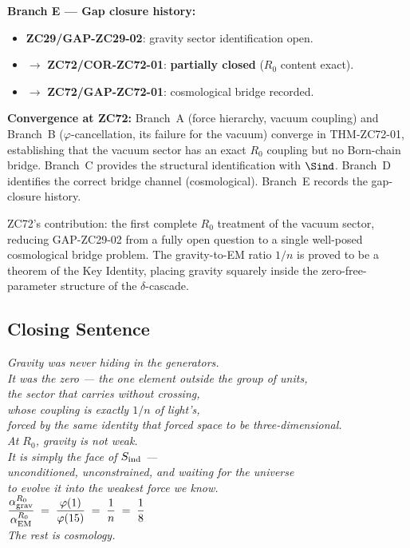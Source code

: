 \documentclass[12pt, a4paper]{article}
\begin{document}
\begin{genealogybox}[title={How ZC72's Key Objects Trace Back}]
\textbf{Branch E --- Gap closure history:}
\begin{itemize}[leftmargin=2em, noitemsep]
  \item \textbf{ZC29/GAP-ZC29-02}: gravity sector identification open.
  \item $\to$ \textbf{ZC72/COR-ZC72-01}:
    \textbf{partially closed} ($R_0$ content exact).
  \item $\to$ \textbf{ZC72/GAP-ZC72-01}: cosmological bridge recorded.
\end{itemize}

\textbf{Convergence at ZC72:}
Branch~A (force hierarchy, vacuum coupling) and Branch~B
($\varphi$-cancellation, its failure for the vacuum)
converge in THM-ZC72-01, establishing that the vacuum sector
has an exact $R_0$ coupling but no Born-chain bridge.
Branch~C provides the structural identification with $\Sind$.
Branch~D identifies the correct bridge channel (cosmological).
Branch~E records the gap-closure history.

ZC72's contribution: the first complete $R_0$ treatment of the
vacuum sector, reducing GAP-ZC29-02 from a fully open question
to a single well-posed cosmological bridge problem.
The gravity-to-EM ratio $1/n$ is proved to be a theorem of the
Key Identity, placing gravity squarely inside the zero-free-parameter
structure of the $\delta$-cascade.
\end{genealogybox}

\subsection{Closing Sentence}

\bigskip
\begin{center}
\textit{%
  Gravity was never hiding in the generators.\\
  It was the zero --- the one element outside the group of units,\\
  the sector that carries without crossing,\\
  whose coupling is exactly $1/n$ of light's,\\
  forced by the same identity that forced space to be three-dimensional.\\[0.5em]
  At $R_0$, gravity is not weak.\\
  It is simply the face of $S_{\rm ind}$ ---\\
  unconditioned, unconstrained, and waiting for the universe\\
  to evolve it into the weakest force we know.\\[0.5em]
  $\displaystyle
    \frac{\alpha_{\rm grav}^{R_0}}{\alpha_{\rm EM}^{R_0}}
    \;=\;
    \frac{\varphi(1)}{\varphi(15)}
    \;=\;
    \frac{1}{n}
    \;=\;
    \frac{1}{8}
  $\\[0.5em]
  \textit{The rest is cosmology.}
}
\end{center}
\end{document}

